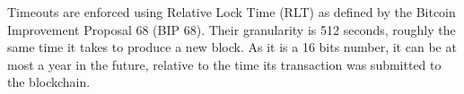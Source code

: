 Timeouts are enforced using Relative Lock Time (RLT) as defined by the Bitcoin
  Improvement Proposal 68 (BIP 68). Their granularity is 512 seconds, roughly
  the same time it takes to produce a new block.
As it is a 16 bits number, it can be at most a year in the future, relative to
  the time its transaction was submitted to the blockchain.

